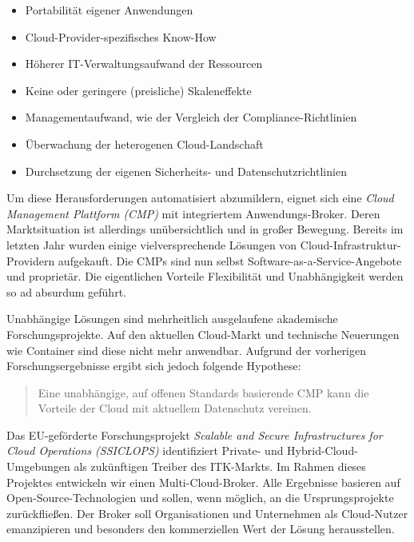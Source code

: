 \begin{itemize}
	\item Portabilität eigener Anwendungen
	\item Cloud-Provider-spezifisches Know-How
	\item Höherer IT-Verwaltungsaufwand der Ressourcen
	\item Keine oder geringere (preisliche) Skaleneffekte
	\item Managementaufwand, wie der Vergleich der Compliance-Richtlinien
	\item Überwachung der heterogenen Cloud-Landschaft
	\item Durchsetzung der eigenen Sicherheits- und Datenschutzrichtlinien
\end{itemize}

\noindent
Um diese Herausforderungen automatisiert abzumildern, eignet sich eine \emph{Cloud Management Plattform (CMP)} mit integriertem Anwendungs-Broker. Deren Marktsituation ist allerdings unübersichtlich und in großer Bewegung. Bereits im letzten Jahr wurden einige vielversprechende Lösungen von Cloud-Infrastruktur-Providern aufgekauft. Die CMPs sind nun selbst Software-as-a-Service-Angebote und proprietär. Die eigentlichen Vorteile Flexibilität und Unabhängigkeit werden so ad absurdum geführt.

Unabhängige Lösungen sind mehrheitlich ausgelaufene akademische Forschungsprojekte. Auf den aktuellen Cloud-Markt und technische Neuerungen wie Container sind diese nicht mehr anwendbar. Aufgrund der vorherigen Forschungsergebnisse ergibt sich jedoch folgende Hypothese:


\begin{verse}
	{Eine unabhängige, auf offenen Standards basierende CMP kann die Vorteile der Cloud mit aktuellem Datenschutz vereinen.}
\end{verse}

\noindent 
Das EU-geförderte Forschungsprojekt \emph{Scalable and Secure Infrastructures for Cloud Operations (SSICLOPS)} identifiziert Private- und Hybrid-Cloud-Umgebungen als zukünftigen Treiber des ITK-Markts. Im Rahmen dieses Projektes entwickeln wir einen Multi-Cloud-Broker. Alle Ergebnisse basieren auf Open-Source-Technologien und sollen, wenn möglich, an die Ursprungsprojekte zurückfließen. Der Broker soll Organisationen und Unternehmen als Cloud-Nutzer emanzipieren und besonders den kommerziellen Wert der Lösung herausstellen.

